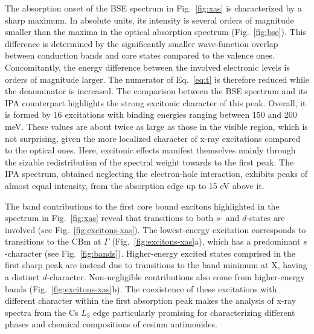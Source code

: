 \documentclass[aps,pra,superscriptaddress,twocolumn]{revtex4}
\begin{document}
The absorption onset of the BSE spectrum in Fig.~\ref{fig:xas} is characterized by a sharp maximum.
In absolute units, its intensity is several orders of magnitude smaller than the maxima in the optical absorption spectrum (Fig.~\ref{fig:bse}).
This difference is determined by the significantly smaller wave-function overlap between conduction bands and core states compared to the valence ones.
Concomitantly, the energy difference between the involved electronic levels is orders of magnitude larger.
The numerator of Eq.~\ref{eq:t} is therefore reduced while the denominator is increased.
The comparison between the BSE spectrum and its IPA counterpart highlights the strong excitonic character of this peak.
Overall, it is formed by 16 excitations with binding energies ranging between 150 and 200 meV.
These values are about twice as large as those in the visible region, which is not surprising, given the more localized character of x-ray excitations compared to the optical ones.
Here, excitonic effects manifest themselves mainly through the sizable redistribution of the spectral weight towards to the first peak.
The IPA spectrum, obtained neglecting the electron-hole interaction, exhibits peaks of almost equal intensity, from the absorption edge up to 15 eV above it.

The band contributions to the first core bound excitons highlighted in the spectrum in Fig.~\ref{fig:xas} reveal that transitions to both $s$- and $d$-states are involved (see Fig.~\ref{fig:excitons-xas}).
The lowest-energy excitation corresponds to transitions to the CBm at $\Gamma$ (Fig.~\ref{fig:excitons-xas}a), which has a predominant $s$-character (see Fig.~\ref{fig:bands}).
Higher-energy excited states comprised in the first sharp peak are instead due to transitions to the band minimum at X, having a distinct $d$-character.
Non-negligible contributions also come from higher-energy bands (Fig.~\ref{fig:excitons-xas}b).
The coexistence of these excitations with different character within the first absorption peak makes the analysis of x-ray spectra from the Cs $L_3$ edge particularly promising for characterizing different phases and chemical compositions of cesium antimonides. 

\end{document}
